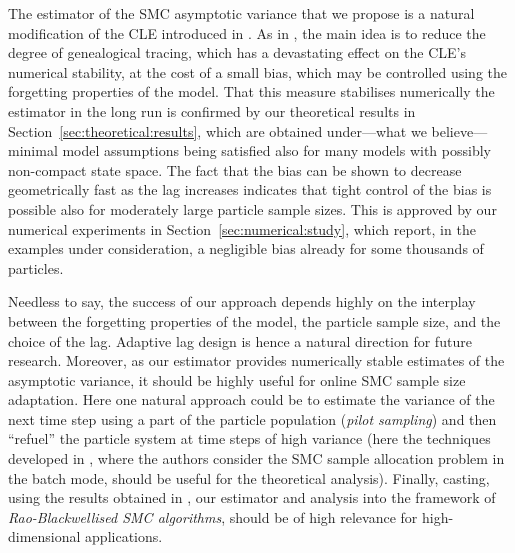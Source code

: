 

The estimator of the SMC asymptotic variance that we propose is a natural modification of the CLE introduced in \cite{chan:lai:2013}. As in \cite{kitagawa:sato:2001,olsson:cappe:douc:moulines:2006}, the main idea is to reduce the degree of genealogical tracing, which has a devastating effect on the CLE's numerical stability, at the cost of a small bias, which may be controlled using the forgetting properties of the model. That this measure stabilises numerically the estimator in the long run is confirmed by our theoretical results in Section~\ref{sec:theoretical:results}, which are obtained under---what we believe---minimal model assumptions being satisfied also for many models with possibly non-compact state space. The fact that the bias can be shown to decrease geometrically fast as the lag increases indicates that tight control of the bias is possible also for moderately large particle sample sizes. This is approved by our numerical experiments in Section~\ref{sec:numerical:study}, which report, in the examples under consideration, a negligible bias already for some thousands of particles.

Needless to say, the success of our approach depends highly on the interplay between the forgetting properties of the model, the particle sample size, and the choice of the lag. Adaptive lag design is hence a natural direction for future research. Moreover, as our estimator provides numerically stable estimates of the asymptotic variance, it should be highly useful for online SMC sample size adaptation. Here one natural approach could be to estimate the variance of the next time step using a part of the particle population (\emph{pilot sampling}) and then ``refuel'' the particle system at time steps of high variance (here the techniques developed in \cite{lee:whiteley:2016}, where the authors consider the SMC sample allocation problem in the batch mode, should be useful for the theoretical analysis). Finally, casting, using the results obtained in \cite{lindsten:shoen:olsson:2011}, our estimator and analysis into the framework of \emph{Rao-Blackwellised SMC algorithms}, should be of high relevance for high-dimensional applications. 

